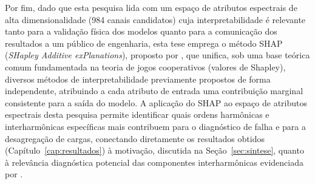 \documentclass[times,final]{elsarticle}
\begin{document}
Por fim, dado que esta pesquisa lida com um espaço de atributos espectrais de alta dimensionalidade (984 canais candidatos) cuja interpretabilidade é relevante tanto para a validação física dos modelos quanto para a comunicação dos resultados a um público de engenharia, esta tese emprega o método SHAP (\textit{SHapley Additive exPlanations}), proposto por \citet{lundberg2017}, que unifica, sob uma base teórica comum fundamentada na teoria de jogos cooperativos (valores de Shapley), diversos métodos de interpretabilidade previamente propostos de forma independente, atribuindo a cada atributo de entrada uma contribuição marginal consistente para a saída do modelo. A aplicação do SHAP ao espaço de atributos espectrais desta pesquisa permite identificar quais ordens harmônicas e interharmônicas específicas mais contribuem para o diagnóstico de falha e para a desagregação de cargas, conectando diretamente os resultados obtidos (Capítulo~\ref{cap:resultados}) à motivação, discutida na Seção~\ref{sec:sintese}, quanto à relevância diagnóstica potencial das componentes interharmônicas evidenciada por \citet{efe2016}.
\end{document}
